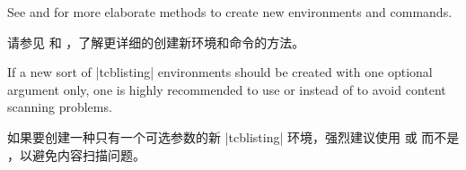 \begin{marker}
See  and  for more
elaborate methods to create new environments and commands.

请参见  和 ，了解更详细的创建新环境和命令的方法。
\end{marker}
\begin{marker}
If a new sort of |tcblisting| environments should be created with
one optional argument only, one is highly recommended to use
 or 
instead of  to
avoid content scanning problems.

如果要创建一种只有一个可选参数的新 |tcblisting| 环境，强烈建议使用  或  而不是 ，以避免内容扫描问题。
\end{marker}

